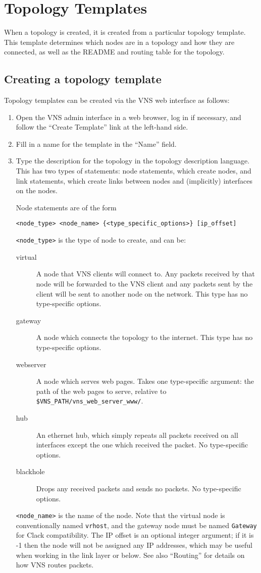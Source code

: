 \documentclass[a4paper,12pt]{report}
\begin{document}
\chapter{Topology Templates}
When a topology is created, it is created from a particular topology template.  This template determines which nodes are in a topology and how they are connected, as well as the README and routing table for the topology.

\section{Creating a topology template}
Topology templates can be created via the VNS web interface as follows:
\begin{enumerate}
\item Open the VNS admin interface in a web browser, log in if necessary, and follow the ``Create Template'' link at the left-hand side.
\item Fill in a name for the template in the ``Name'' field.
\item Type the description for the topology in the topology description language.  This has two types of statements: node statements, which create nodes, and link statements, which create links between nodes and (implicitly) interfaces on the nodes.

Node statements are of the form

\texttt{<node\_type> <node\_name> \{<type\_specific\_options>\} [ip\_offset]}

\texttt{<node\_type>} is the type of node to create, and can be:
\begin{description}
\item[virtual] A node that VNS clients will connect to.  Any packets received by that node will be forwarded to the VNS client and any packets sent by the client will be sent to another node on the network.  This type has no type-specific options.
\item[gateway] A node which connects the topology to the internet.  This type has no type-specific options.
\item[webserver] A node which serves web pages.  Takes one type-specific argument: the path of the web pages to serve, relative to \texttt{\$VNS\_PATH/vns\_web\_server\_www/}.
\item[hub] An ethernet hub, which simply repeats all packets received on all interfaces except the one which received the packet. No type-specific options.
\item[blackhole] Drops any received packets and sends no packets.  No type-specific options.
\end{description}
\texttt{<node\_name>} is the name of the node.  Note that the virtual node is conventionally named \texttt{vrhost}, and the gateway node must be named \texttt{Gateway} for Clack compatibility.  The IP offset is an optional integer argument; if it is -1 then the node will not be assigned any IP addresses, which may be useful when working in the link layer or below.  See also ``Routing'' for details on how VNS routes packets.


\end{enumerate}
\end{document}
